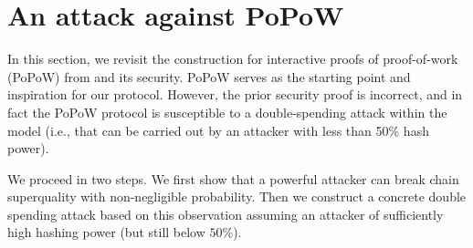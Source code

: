\section{An attack against PoPoW \cite{KLS}}
\label{sec:attack}

In this section, we revisit the construction for interactive proofs of
proof-of-work (PoPoW) from \cite{KLS} and its security.
PoPoW serves as the starting point and inspiration for our protocol.
However, the prior security proof is incorrect, and in fact the PoPoW protocol is susceptible to a double-spending attack within the model (i.e., that can be carried out by an attacker with less than 50\% hash power).

We proceed in two steps. We first show that a powerful attacker can break chain
superquality with non-negligible probability. Then we construct a concrete
double spending  attack based on this observation assuming an attacker
of sufficiently high hashing power (but still below $50\%$). 

